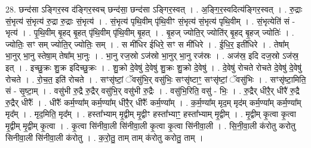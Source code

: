 \documentclass[17pt]{extarticle}
\begin{document}
28. छन्द॑सा ऽङ्गिर॒स्व द॑ङ्गिर॒स्वच् छन्द॑सा॒ छन्द॑सा ऽङ्गिर॒स्वत् । . अ॒ङ्गि॒र॒स्वदित्य॑ङ्गिर॒स्वत् । . रु॒द्राः सं॒भृत्य॑ सं॒भृत्य॑ रु॒द्रा रु॒द्राः सं॒भृत्य॑ । . सं॒भृत्य॑ पृथि॒वीम् पृ॑थि॒वीꣳ सं॒भृत्य॑ सं॒भृत्य॑ पृथि॒वीम् । . सं॒भृत्येति॑ सं - भृत्य॑ । . पृ॒थि॒वीम् बृ॒हद् बृ॒हत् पृ॑थि॒वीम् पृ॑थि॒वीम् बृ॒हत् । . बृ॒हज् ज्योति॒र् ज्योति॑र् बृ॒हद् बृ॒हज् ज्योतिः॑ । . ज्योतिः॒ सꣳ सम् ज्योति॒र् ज्योतिः॒ सम् । . स मी॑धिर ईधिरे॒ सꣳ स मी॑धिरे । . ई॒धि॒र॒ इती॑धिरे । . तेषा᳚म् भा॒नुर् भा॒नु स्तेषा॒म् तेषा᳚म् भा॒नुः । . भा॒नु रज॒स्रो ऽज॑स्रो भा॒नुर् भा॒नु रज॑स्रः । . अज॑स्र॒ इदि दज॒स्रो ऽज॑स्र॒ इत् । . इच्छु॒क्रः शु॒क्र इदिच्छु॒क्रः । . शु॒क्रो दे॒वेषु॑ दे॒वेषु॑ शु॒क्रः शु॒क्रो दे॒वेषु॑ । . दे॒वेषु॑ रोचते रोचते दे॒वेषु॑ दे॒वेषु॑ रोचते । . रो॒च॒त॒ इति॑ रोचते । . सꣳसृ॑ष्टां॒ ॅवसु॑भि॒र् वसु॑भिः॒ सꣳसृ॑ष्टाꣳ॒॒ सꣳसृ॑ष्टां॒ ॅवसु॑भिः । . सꣳसृ॑ष्टा॒मिति॒ सं - सृ॒ष्टा॒म् । . वसु॑भी रु॒द्रै रु॒द्रैर् वसु॑भि॒र् वसु॑भी रु॒द्रैः । . वसु॑भि॒रिति॒ वसु॑ - भिः॒ । . रु॒द्रैर् धीरै॒र् धीरै॑ रु॒द्रै रु॒द्रैर् धीरैः᳚ । . धीरैः᳚ कर्म॒ण्या᳚म् कर्म॒ण्या᳚म् धीरै॒र् धीरैः᳚ कर्म॒ण्या᳚म् । . क॒र्म॒ण्या᳚म् मृद॒म् मृद॑म् कर्म॒ण्या᳚म् कर्म॒ण्या᳚म् मृद᳚म् । . मृद॒मिति॒ मृद᳚म् । . हस्ता᳚भ्याम् मृ॒द्वीम् मृ॒द्वीꣳ हस्ता᳚भ्याꣳ॒॒ हस्ता᳚भ्याम् मृ॒द्वीम् । . मृ॒द्वीम् कृ॒त्वा कृ॒त्वा मृ॒द्वीम् मृ॒द्वीम् कृ॒त्वा । . कृ॒त्वा सि॑नीवा॒ली सि॑नीवा॒ली कृ॒त्वा कृ॒त्वा सि॑नीवा॒ली । . सि॒नी॒वा॒ली क॑रोतु करोतु सिनीवा॒ली सि॑नीवा॒ली क॑रोतु । . क॒रो॒तु॒ ताम् ताम् क॑रोतु करोतु॒ ताम् । \newline
\end{document}
